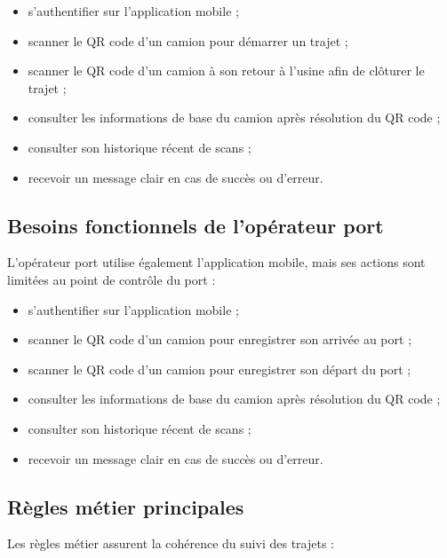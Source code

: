 \begin{itemize}
    \item s'authentifier sur l'application mobile ;
    \item scanner le QR code d'un camion pour démarrer un trajet ;
    \item scanner le QR code d'un camion à son retour à l'usine afin de clôturer le trajet ;
    \item consulter les informations de base du camion après résolution du QR code ;
    \item consulter son historique récent de scans ;
    \item recevoir un message clair en cas de succès ou d'erreur.
\end{itemize}

\subsection{Besoins fonctionnels de l'opérateur port}

L'opérateur port utilise également l'application mobile, mais ses actions sont limitées au point de contrôle du port :

\begin{itemize}
    \item s'authentifier sur l'application mobile ;
    \item scanner le QR code d'un camion pour enregistrer son arrivée au port ;
    \item scanner le QR code d'un camion pour enregistrer son départ du port ;
    \item consulter les informations de base du camion après résolution du QR code ;
    \item consulter son historique récent de scans ;
    \item recevoir un message clair en cas de succès ou d'erreur.
\end{itemize}

\subsection{Règles métier principales}

Les règles métier assurent la cohérence du suivi des trajets :

